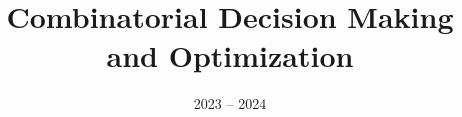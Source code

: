 \documentclass[11pt]{ainotes}
\title{Combinatorial Decision Making\\and Optimization}
\date{2023 -- 2024}
\begin{document}
    
    \makenotesfront
    
\end{document}
